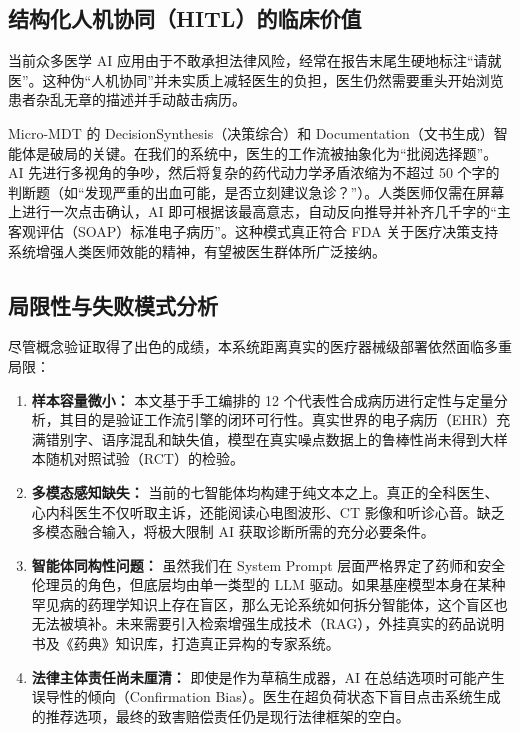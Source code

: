 \documentclass[11pt,a4paper]{ctexart}
\begin{document}
\subsection{结构化人机协同（HITL）的临床价值}

当前众多医学 AI 应用由于不敢承担法律风险，经常在报告末尾生硬地标注“请就医”。这种伪“人机协同”并未实质上减轻医生的负担，医生仍然需要重头开始浏览患者杂乱无章的描述并手动敲击病历。

Micro-MDT 的 DecisionSynthesis（决策综合）和 Documentation（文书生成）智能体是破局的关键。在我们的系统中，医生的工作流被抽象化为“批阅选择题”。AI 先进行多视角的争吵，然后将复杂的药代动力学矛盾浓缩为不超过 50 个字的判断题（如“发现严重的出血可能，是否立刻建议急诊？”）。人类医师仅需在屏幕上进行一次点击确认，AI 即可根据该最高意志，自动反向推导并补齐几千字的“主客观评估（SOAP）标准电子病历”。这种模式真正符合 FDA 关于医疗决策支持系统增强人类医师效能的精神，有望被医生群体所广泛接纳。

\subsection{局限性与失败模式分析}

尽管概念验证取得了出色的成绩，本系统距离真实的医疗器械级部署依然面临多重局限：

\begin{enumerate}
    \item \textbf{样本容量微小：} 本文基于手工编排的 12 个代表性合成病历进行定性与定量分析，其目的是验证工作流引擎的闭环可行性。真实世界的电子病历（EHR）充满错别字、语序混乱和缺失值，模型在真实噪点数据上的鲁棒性尚未得到大样本随机对照试验（RCT）的检验。
    \item \textbf{多模态感知缺失：} 当前的七智能体均构建于纯文本之上。真正的全科医生、心内科医生不仅听取主诉，还能阅读心电图波形、CT 影像和听诊心音。缺乏多模态融合输入，将极大限制 AI 获取诊断所需的充分必要条件。
    \item \textbf{智能体同构性问题：} 虽然我们在 System Prompt 层面严格界定了药师和安全伦理员的角色，但底层均由单一类型的 LLM 驱动。如果基座模型本身在某种罕见病的药理学知识上存在盲区，那么无论系统如何拆分智能体，这个盲区也无法被填补。未来需要引入检索增强生成技术（RAG），外挂真实的药品说明书及《药典》知识库，打造真正异构的专家系统。
    \item \textbf{法律主体责任尚未厘清：} 即使是作为草稿生成器，AI 在总结选项时可能产生误导性的倾向（Confirmation Bias）。医生在超负荷状态下盲目点击系统生成的推荐选项，最终的致害赔偿责任仍是现行法律框架的空白。
\end{enumerate}
\end{document}
